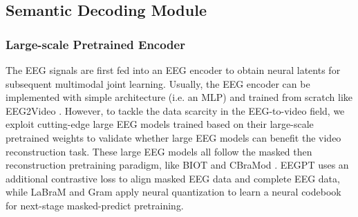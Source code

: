 \documentclass{article}
\begin{document}
\subsection{Semantic Decoding Module}
\subsubsection{Large-scale Pretrained Encoder}
The EEG signals are first fed into an EEG encoder to obtain neural latents for subsequent multimodal joint learning.
Usually, the EEG encoder can be implemented with simple architecture (i.e. an MLP) and trained from scratch like EEG2Video \cite{liu2024eeg2video}. However, to tackle the data scarcity in the EEG-to-video field, we exploit cutting-edge large EEG models trained based on their large-scale pretrained weights to validate whether large EEG models can benefit the video reconstruction task.
These large EEG models all follow the masked then reconstruction pretraining paradigm, like BIOT \cite{yang2023biot} and CBraMod \cite{wang2024cbramod}. EEGPT \cite{yue2024eegpt} uses an additional contrastive loss to align masked EEG data and complete EEG data, while LaBraM \cite{jiang2024large} and Gram \cite{li2025gram} apply neural quantization to learn a neural codebook for next-stage masked-predict pretraining.
\end{document}
